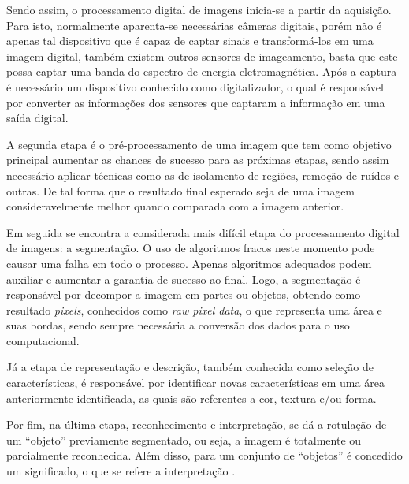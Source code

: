 \par Sendo assim, o processamento digital de imagens inicia-se a partir da aquisição. Para isto, normalmente aparenta-se necessárias câmeras digitais, porém não é apenas tal dispositivo que é capaz de captar sinais e transformá-los em uma imagem digital, também existem outros sensores de imageamento, basta que este possa captar uma banda do espectro de energia eletromagnética. Após a captura é necessário um dispositivo conhecido como digitalizador, o qual é responsável por converter as informações dos sensores que captaram a informação em uma saída digital.

\par A segunda etapa é o pré-processamento de uma imagem que tem como objetivo principal aumentar as chances de sucesso para as próximas etapas, sendo assim necessário aplicar técnicas como as de isolamento de regiões, remoção de ruídos e outras. De tal forma que o resultado final esperado seja de uma imagem consideravelmente melhor quando comparada com a imagem anterior.

\par Em seguida se encontra a considerada mais difícil etapa do processamento digital de imagens: a segmentação. O uso de algoritmos fracos neste momento pode causar uma falha em todo o processo. Apenas algoritmos adequados podem auxiliar e aumentar a garantia de sucesso ao final. Logo, a segmentação é responsável por decompor a imagem em partes ou objetos, obtendo como resultado \textit{pixels}, conhecidos como \textit{raw pixel data}, o que representa uma área e suas bordas, sendo sempre necessária a conversão dos dados para o uso computacional.

\par Já a etapa de representação e descrição, também conhecida como seleção de características, é responsável por identificar novas características em uma área anteriormente identificada, as quais são referentes a cor, textura e/ou forma.

\par Por fim, na última etapa, reconhecimento e interpretação, se dá a rotulação de um ``objeto'' previamente segmentado, ou seja, a imagem é totalmente ou parcialmente reconhecida. Além disso, para um conjunto de ``objetos'' é concedido um significado, o que se refere a interpretação \cite{Gonzalez2009}.


